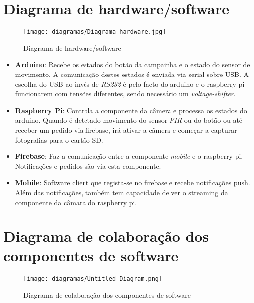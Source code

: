 \documentclass{article}
\begin{document}
\section{Diagrama de hardware/software}

    \begin{figure}[h!]
    \centering
    \texttt{[image: diagramas/Diagrama\_hardware.jpg]}
    \caption{Diagrama de hardware/software}
    \label{fig:diaHardware}
\end{figure}

\begin{itemize}
    \item \textbf{Arduino}: Recebe os estados do botão da campainha e o estado do sensor de movimento. A comunicação destes estados é enviada via serial sobre USB. A escolha do USB ao invés de \textit{RS232} é pelo facto do arduino e o raspberry pi funcionarem com tensões diferentes, sendo necessário um \textit{voltage-shifter}.
    \item \textbf{Raspberry Pi}: Controla a componente da câmera e processa os estados do arduino. Quando é detetado movimento do sensor \textit{PIR} ou do botão ou até receber um pedido via firebase, irá ativar a câmera e começar a capturar fotografias para o cartão SD.
    \item \textbf{Firebase}: Faz a comunicação entre a componente \textit{mobile} e o raspberry pi. Notificações e pedidos são via esta componente.
    \item \textbf{Mobile}: Software client que regista-se no firebase e recebe notificações push. Além das notificações, também tem capacidade de ver o streaming da componente da câmara do raspberry pi.
\end{itemize}

\section{Diagrama de colaboração dos componentes de software}

\begin{figure}[h!]
    \centering
    \texttt{[image: diagramas/Untitled Diagram.png]}
    \caption{Diagrama de colaboração dos componentes de software}
    \label{fig:diagGantt}
\end{figure}
\end{document}
